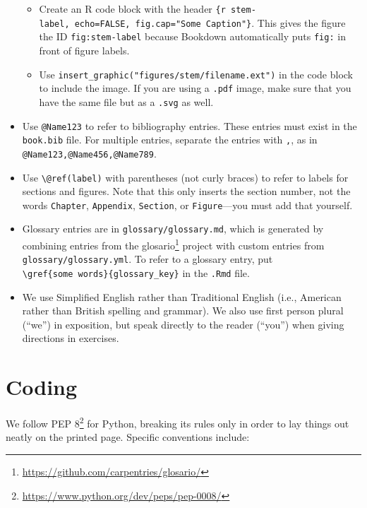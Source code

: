 \documentclass[
]{krantz}
\providecommand{\tightlist}{%
  \setlength{\itemsep}{0pt}\setlength{\parskip}{0pt}}
\renewcommand{\href}[2]{#2\footnote{\url{#1}}}
\begin{document}
\begin{itemize}
  \begin{itemize}
  \tightlist
  \item
    Create an R code block with the header \texttt{\{r\ stem-label,\ echo=FALSE,\ fig.cap="Some\ Caption"\}}.
    This gives the figure the ID \texttt{fig:stem-label} because Bookdown
    automatically puts \texttt{fig:} in front of figure labels.
  \item
    Use \texttt{insert\_graphic("figures/stem/filename.ext")} in the code block to
    include the image. If you are using a \texttt{.pdf} image, make sure that you
    have the same file but as a \texttt{.svg} as well.
  \end{itemize}
\item
  Use \texttt{@Name123} to refer to bibliography entries. These entries must exist in
  the \texttt{book.bib} file. For multiple entries, separate the entries with \texttt{,},
  as in \texttt{@Name123,@Name456,@Name789}.
\item
  Use \texttt{\textbackslash{}@ref(label)} with parentheses (not curly braces) to refer to labels
  for sections and figures. Note that this only inserts the section number,
  not the words \texttt{Chapter}, \texttt{Appendix}, \texttt{Section}, or \texttt{Figure}---you must add
  that yourself.
\item
  Glossary entries are in \texttt{glossary/glossary.md}, which is generated by
  combining entries from the
  \href{https://github.com/carpentries/glosario/}{glosario} project with custom
  entries from \texttt{glossary/glossary.yml}. To refer to a glossary entry, put
  \texttt{\textbackslash{}gref\{some\ words\}\{glossary\_key\}} in the \texttt{.Rmd} file.
\item
  We use Simplified English rather than Traditional English (i.e., American
  rather than British spelling and grammar). We also use first person plural
  (``we'') in exposition, but speak directly to the reader (``you'') when giving
  directions in exercises.
\end{itemize}

\hypertarget{coding}{%
\section*{Coding}\label{coding}}


We follow \href{https://www.python.org/dev/peps/pep-0008/}{PEP 8} for Python,
breaking its rules only in order to lay things out neatly on the printed page.
Specific conventions include:
\end{document}
